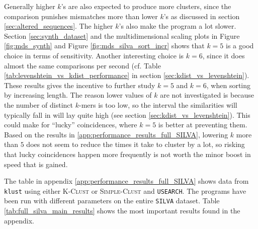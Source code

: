 Generally higher $k$'s are also expected to produce more clusters, since the
comparison punishes mismatches more than lower $k$'s as discussed in section
\ref{sec:altered_sequences}. The higher $k$'s also make the program a lot
slower. Section \ref{sec:synth_dataset} and the multidimensional scaling plots
in Figure \ref{fig:mds_synth} and Figure \ref{fig:mds_silva_sort_incr} shows
that $k=5$ is a good choice in terms of sensitivity. Another interesting
choice is $k=6$, since it does almost the same comparisons per second (cf.
Table \ref{tab:levenshtein_vs_kdist_performance} in section
\ref{sec:kdist_vs_levenshtein}). These results gives the incentive to further
study $k=5$ and $k=6$, when sorting by increasing length. The reason lower
values of $k$ are not investigated is because the number of distinct $k$-mers
is too low, so the interval the similarities will typically fall in will lay
quite high (see section \ref{sec:kdist_vs_levenshtein}). This could make for
``lucky'' coincidences, where $k=5$ is better at preventing them. Based on the
results in \ref{app:performance_results_full_SILVA}, lowering $k$ more than
$5$ does not seem to reduce the times it take to cluster by a lot, so risking
that lucky coincidences happen more frequently is not worth the minor boost in
speed that is gained.

The table in appendix \ref{app:performance_results_full_SILVA} shows data
from \texttt{klust} using either \textsc{K-Clust} or \textsc{Simple-Clust} and
\texttt{USEARCH}. The programs have been run with different parameters on the
entire \texttt{SILVA} dataset. Table \ref{tab:full_silva_main_results} shows
the most important results found in the appendix.

